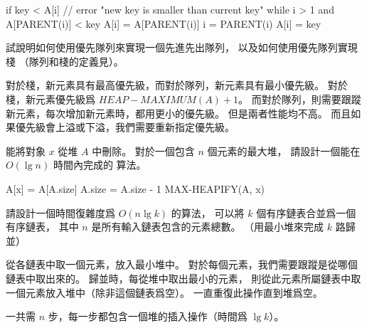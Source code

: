 \startANSWER
{}
\startCLRSCODE
if key < A[i]
	// error "new key is smaller than current key"
while i > 1 and A[PARENT(i)] < key
	A[i] = A[PARENT(i)]
	i = PARENT(i)
A[i] = key
\stopCLRSCODE
\stopANSWER

\startEXERCISE
試說明如何使用優先隊列來實現一個先進先出隊列，
以及如何使用優先隊列實現棧
（隊列和棧的定義見）。
\stopEXERCISE

\startANSWER
對於棧，新元素具有最高優先級，而對於隊列，新元素具有最小優先級。
對於棧，新元素優先級爲 $HEAP-MAXIMUM(A) + 1$。
而對於隊列，則需要跟蹤新元素，每次增加新元素時，都用更小的優先級。
但是兩者性能均不高。
而且如果優先級會上溢或下溢，我們需要重新指定優先級。
\stopANSWER

\startEXERCISE
{} 能將對象 $x$ 從堆 $A$ 中刪除。
對於一個包含 $n$ 個元素的最大堆，
請設計一個能在 $O(\lg{n})$ 時間內完成的  算法。
\stopEXERCISE

\startANSWER
{}
\startCLRSCODE
A[x] = A[A.size]
A.size = A.size - 1
MAX-HEAPIFY(A, x)
\stopCLRSCODE
\stopANSWER

請設計一個時間復雜度爲 $O(n\lg{k})$ 的算法，
可以將 $k$ 個有序鏈表合並爲一個有序鏈表，
其中 $n$ 是所有輸入鏈表包含的元素總數。
（\hint 用最小堆來完成 $k$ 路歸並）
\stopEXERCISE

\startANSWER
從各鏈表中取一個元素，放入最小堆中。
對於每個元素，我們需要跟蹤是從哪個鏈表中取出來的。
歸並時，每從堆中取出最小的元素，
則從此元素所屬鏈表中取一個元素放入堆中（除非這個鏈表爲空）。
一直重復此操作直到堆爲空。

一共需 $n$ 步，每一步都包含一個堆的插入操作（時間爲 $\lg{k}$）。
\stopANSWER

\stopsection
